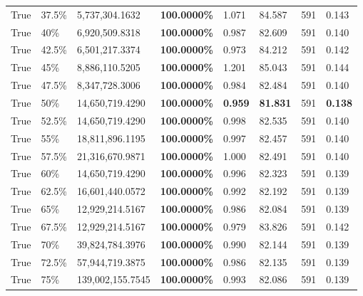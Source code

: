 \begin{table}[H]
\begin{tabular}{lllrllll}
True & 37.5\% & 5,737,304.1632 & \bfseries \color{red} 100.0000\% & 1.071 & 84.587 & 591 & 0.143 \\
\cline{1-8} \cline{2-8}
True & 40\% & 6,920,509.8318 & \bfseries \color{red} 100.0000\% & 0.987 & 82.609 & 591 & 0.140 \\
\cline{1-8} \cline{2-8}
True & 42.5\% & 6,501,217.3374 & \bfseries \color{red} 100.0000\% & 0.973 & 84.212 & 591 & 0.142 \\
\cline{1-8} \cline{2-8}
True & 45\% & 8,886,110.5205 & \bfseries \color{red} 100.0000\% & 1.201 & 85.043 & 591 & 0.144 \\
\cline{1-8} \cline{2-8}
True & 47.5\% & 8,347,728.3006 & \bfseries \color{red} 100.0000\% & 0.984 & 82.484 & 591 & 0.140 \\
\cline{1-8} \cline{2-8}
True & 50\% & 14,650,719.4290 & \bfseries \color{red} 100.0000\% & \bfseries \color{red} 0.959 & \bfseries \color{red} 81.831 & 591 & \bfseries \color{red} 0.138 \\
\cline{1-8} \cline{2-8}
True & 52.5\% & 14,650,719.4290 & \bfseries \color{red} 100.0000\% & 0.998 & 82.535 & 591 & 0.140 \\
\cline{1-8} \cline{2-8}
True & 55\% & 18,811,896.1195 & \bfseries \color{red} 100.0000\% & 0.997 & 82.457 & 591 & 0.140 \\
\cline{1-8} \cline{2-8}
True & 57.5\% & 21,316,670.9871 & \bfseries \color{red} 100.0000\% & 1.000 & 82.491 & 591 & 0.140 \\
\cline{1-8} \cline{2-8}
True & 60\% & 14,650,719.4290 & \bfseries \color{red} 100.0000\% & 0.996 & 82.323 & 591 & 0.139 \\
\cline{1-8} \cline{2-8}
True & 62.5\% & 16,601,440.0572 & \bfseries \color{red} 100.0000\% & 0.992 & 82.192 & 591 & 0.139 \\
\cline{1-8} \cline{2-8}
True & 65\% & 12,929,214.5167 & \bfseries \color{red} 100.0000\% & 0.986 & 82.084 & 591 & 0.139 \\
\cline{1-8} \cline{2-8}
True & 67.5\% & 12,929,214.5167 & \bfseries \color{red} 100.0000\% & 0.979 & 83.826 & 591 & 0.142 \\
\cline{1-8} \cline{2-8}
True & 70\% & 39,824,784.3976 & \bfseries \color{red} 100.0000\% & 0.990 & 82.144 & 591 & 0.139 \\
\cline{1-8} \cline{2-8}
True & 72.5\% & 57,944,719.3875 & \bfseries \color{red} 100.0000\% & 0.986 & 82.135 & 591 & 0.139 \\
\cline{1-8} \cline{2-8}
True & 75\% & 139,002,155.7545 & \bfseries \color{red} 100.0000\% & 0.993 & 82.086 & 591 & 0.139 \\

\end{tabular}
\end{table}
